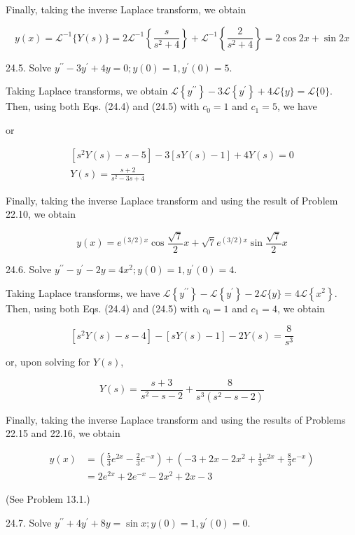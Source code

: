 \documentclass[10pt]{article}
\begin{document}
Finally, taking the inverse Laplace transform, we obtain

$$
y(x)=\mathscr{L}^{-1}\{Y(s)\}=2 \mathscr{L}^{-1}\left\{\frac{s}{s^{2}+4}\right\}+\mathscr{L}^{-1}\left\{\frac{2}{s^{2}+4}\right\}=2 \cos 2 x+\sin 2 x
$$

24.5. Solve $y^{\prime \prime}-3 y^{\prime}+4 y=0 ; y(0)=1, y^{\prime}(0)=5$.

Taking Laplace transforms, we obtain $\mathscr{L}\left\{y^{\prime \prime}\right\}-3 \mathscr{L}\left\{y^{\prime}\right\}+4 \mathscr{L}\{y\}=\mathscr{L}\{0\}$. Then, using both Eqs. (24.4) and (24.5) with $c_{0}=1$ and $c_{1}=5$, we have

or

$$
\begin{gathered}
{\left[s^{2} Y(s)-s-5\right]-3[s Y(s)-1]+4 Y(s)=0} \\
Y(s)=\frac{s+2}{s^{2}-3 s+4}
\end{gathered}
$$

Finally, taking the inverse Laplace transform and using the result of Problem 22.10, we obtain

$$
y(x)=e^{(3 / 2) x} \cos \frac{\sqrt{7}}{2} x+\sqrt{7} e^{(3 / 2) x} \sin \frac{\sqrt{7}}{2} x
$$

24.6. Solve $y^{\prime \prime}-y^{\prime}-2 y=4 x^{2} ; y(0)=1, y^{\prime}(0)=4$.

Taking Laplace transforms, we have $\mathscr{L}\left\{y^{\prime \prime}\right\}-\mathscr{L}\left\{y^{\prime}\right\}-2 \mathscr{L}\{y\}=4 \mathscr{L}\left\{x^{2}\right\}$. Then, using both Eqs. (24.4) and (24.5) with $c_{0}=1$ and $c_{1}=4$, we obtain

$$
\left[s^{2} Y(s)-s-4\right]-[s Y(s)-1]-2 Y(s)=\frac{8}{s^{3}}
$$

or, upon solving for $Y(s)$,

$$
Y(s)=\frac{s+3}{s^{2}-s-2}+\frac{8}{s^{3}\left(s^{2}-s-2\right)}
$$

Finally, taking the inverse Laplace transform and using the results of Problems 22.15 and 22.16, we obtain

$$
\begin{aligned}
y(x) & =\left(\frac{5}{3} e^{2 x}-\frac{2}{3} e^{-x}\right)+\left(-3+2 x-2 x^{2}+\frac{1}{3} e^{2 x}+\frac{8}{3} e^{-x}\right) \\
& =2 e^{2 x}+2 e^{-x}-2 x^{2}+2 x-3
\end{aligned}
$$

(See Problem 13.1.)

24.7. Solve $y^{\prime \prime}+4 y^{\prime}+8 y=\sin x ; y(0)=1, y^{\prime}(0)=0$.
\end{document}
